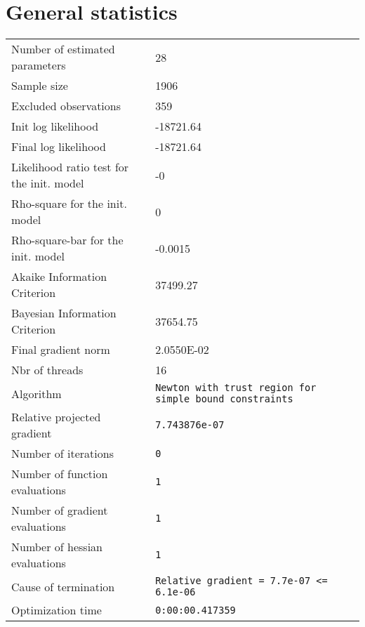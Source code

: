 



\section{General statistics}
\begin{tabular}{ll}
Number of estimated parameters & 28 \\
Sample size & 1906 \\
Excluded observations & 359 \\
Init log likelihood & -18721.64 \\
Final log likelihood & -18721.64 \\
Likelihood ratio test for the init. model & -0 \\
Rho-square for the init. model & 0 \\
Rho-square-bar for the init. model & -0.0015 \\
Akaike Information Criterion & 37499.27 \\
Bayesian Information Criterion & 37654.75 \\
Final gradient norm & 2.0550E-02 \\
Nbr of threads & 16 \\
Algorithm & \verb$Newton with trust region for simple bound constraints$ \\
Relative projected gradient & \verb$7.743876e-07$ \\
Number of iterations & \verb$0$ \\
Number of function evaluations & \verb$1$ \\
Number of gradient evaluations & \verb$1$ \\
Number of hessian evaluations & \verb$1$ \\
Cause of termination & \verb$Relative gradient = 7.7e-07 <= 6.1e-06$ \\
Optimization time & \verb$0:00:00.417359$ \\
\end{tabular}


